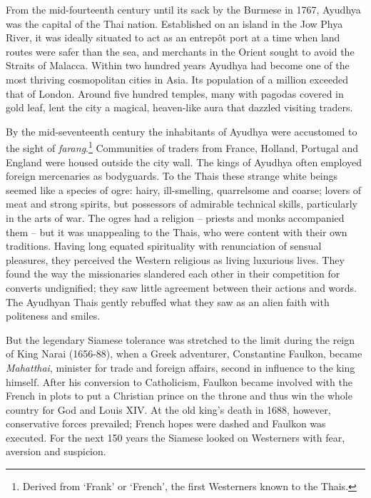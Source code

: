 
From the mid-fourteenth century until its sack by the Burmese in
1767, Ayudhya was the capital of the Thai nation. Established on an
island in the Jow Phya River, it was ideally situated to act as an
entrepôt port at a time when land routes were safer than the sea, and
merchants in the Orient sought to avoid the Straits of Malacca. Within
two hundred years Ayudhya had become one of the most thriving
cosmopolitan cities in Asia. Its population of a million exceeded that
of London. Around five hundred temples, many with pagodas covered in
gold leaf, lent the city a magical, heaven-like aura that dazzled
visiting traders. 

By the mid-seventeenth century the inhabitants of Ayudhya were
accustomed to the sight of \emph{farang}.\footnote{Derived from `Frank'
  or `French', the first Westerners known to the Thais.} Communities of
traders from France, Holland, Portugal and England were housed outside
the city wall. The kings of Ayudhya often employed foreign mercenaries
as bodyguards. To the Thais these strange white beings seemed like a
species of ogre: hairy, ill-smelling, quarrelsome and coarse; lovers of
meat and strong spirits, but possessors of admirable technical skills, 
particularly in the arts of war. The ogres had a religion -- priests
and monks accompanied them -- but it was unappealing to the Thais, who
were content with their own traditions. Having long equated spirituality
with renunciation of sensual pleasures, they perceived the Western
religious as living luxurious lives. They found the way the missionaries
slandered each other in their competition for converts undignified; they
saw little agreement between their actions and words. The Ayudhyan Thais
gently rebuffed what they saw as an alien faith with politeness and
smiles. 

But the legendary Siamese tolerance was stretched to the limit during
the reign of King Narai (1656-88), when a Greek adventurer, Constantine
Faulkon, became \emph{Mahatthai}, minister for trade and foreign
affairs, second in influence to the king himself. After his conversion
to Catholicism, Faulkon became involved with the French in plots to put
a Christian prince on the throne and thus win the whole country for God
and Louis XIV. At the old king's death in 1688, however, conservative
forces prevailed; French hopes were dashed and Faulkon was executed. For
the next 150 years the Siamese looked on Westerners with fear, aversion
and suspicion. 

